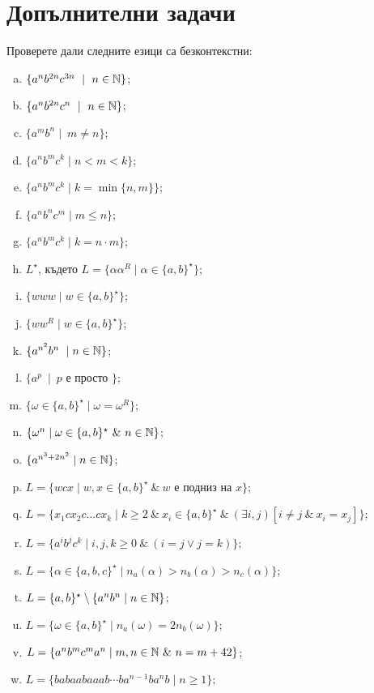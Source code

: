 \section{Допълнителни задачи}

\begin{problem}
  Проверете дали следните езици са безконтекстни:
  \begin{enumerate}[a)]
  \item
    $\{a^nb^{2n}c^{3n}\ \mid\ n\in\Nat\}$;
  \item
    $\{a^nb^{2n}c^{n}\ \mid\ n\in\Nat\}$;
  \item
    $\{a^mb^n\mid\ m \neq n\}$;
  \item
    $\{a^nb^mc^k\mid n < m < k\}$;
  \item
    $\{a^nb^mc^k\mid k = \min\{n,m\}\}$;
  \item
    $\{a^nb^nc^m\mid m \leq n\}$;
  \item
    $\{a^nb^mc^k\mid k = n\cdot m\}$;
  \item
    $L^\star$, където
    $L = \{\alpha\alpha^R \mid \alpha \in \{a,b\}^\star\}$;
  \item
    $\{www\mid w\in \{a,b\}^\star\}$;
  \item
    $\{ww^R\mid w\in \{a,b\}^\star\}$;
  \item
    $\{a^{n^2}b^n\ \mid n \in \mathbb{N}\}$;
  \item
    $\{a^p\ \mid\ p\mbox{ е просто }\}$;
  \item
    $\{\omega \in \{a,b\}^\star \mid \omega = \omega^R\}$;
  \item
    $\{\omega^n \mid \omega \in \{a,b\}^\star\ \&\ n \in \mathbb{N}\}$;
  \item
    $\{a^{n^3 + 2n^2} \mid n \in \mathbb{N}\}$;
  \item
    $L = \{w c x\mid w,x\in \{a,b\}^\star\ \&\ w\mbox{ е подниз на }x\}$;
  \item
    $L = \{x_1 c x_2 c \dots c x_k\mid k\geq 2\ \&\ x_i\in\{a,b\}^\star\ \&\ (\exists i,j)[i \neq j\ \&\ x_i = x_j]\}$;
  \item
    $L = \{a^ib^jc^k\mid i,j,k\geq 0\ \&\ (i = j \vee j = k)\}$;
  \item
    $L = \{\alpha \in \{a,b,c\}^\star\mid n_a(\alpha) > n_b(\alpha) > n_c(\alpha)\}$;
  \item
    $L = \{a,b\}^\star \setminus \{a^nb^n\mid n\in \mathbb{N}\}$;
  \item
    $L = \{\omega \in \{a,b\}^\star \mid n_a(\omega) = 2n_b(\omega)\}$;
  \item
    $L = \{a^nb^mc^ma^n \mid m,n\in\Nat\ \&\ n = m+42\}$;
  \item
    $L = \{babaabaaab\cdots ba^{n-1}ba^nb \mid n \geq 1\}$;


\end{enumerate}
\end{problem}
